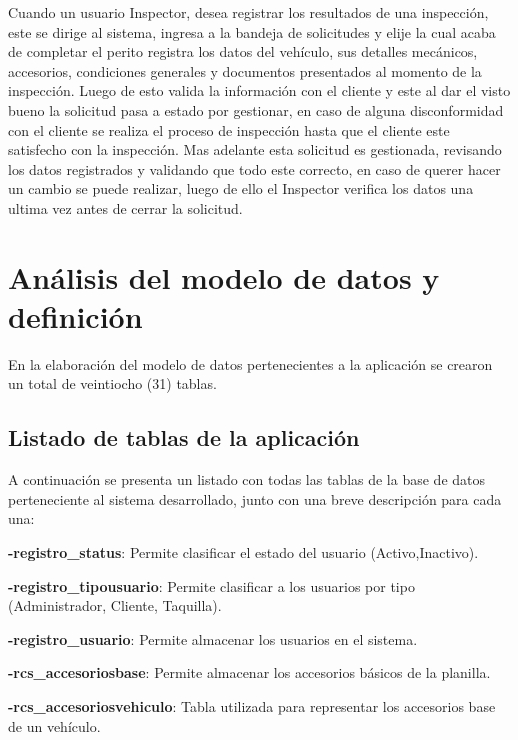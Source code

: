 Cuando un usuario Inspector, desea registrar los resultados de una inspección, este se dirige al sistema, ingresa a la bandeja de solicitudes y elije la cual acaba de completar el perito registra los datos del vehículo, sus detalles mecánicos, accesorios, condiciones generales y documentos presentados al momento de la inspección. Luego de esto valida la información con el cliente y este al dar el visto bueno la solicitud pasa a estado por gestionar, en caso de alguna disconformidad con el cliente se realiza el proceso de inspección hasta que el cliente este satisfecho con la inspección. Mas adelante esta solicitud es gestionada, revisando los datos registrados y validando que todo este correcto, en caso de querer hacer un cambio se puede realizar, luego de ello el Inspector verifica los datos una ultima vez antes de cerrar la solicitud.
\setlength{\parskip}{0mm}


\section{Análisis del modelo de datos y definición} 
\setlength{\parskip}{5mm}

En la elaboración del modelo de datos pertenecientes a la aplicación se crearon un total de veintiocho (31) tablas.

\setlength{\parskip}{0mm}

\subsection{Listado de tablas de la aplicación}

\setlength{\parskip}{5mm}

A continuación se presenta un listado con todas las tablas de la base de datos perteneciente al sistema desarrollado, junto con una breve descripción para cada una:


\textbf{-registro\_status}: Permite clasificar el estado del usuario (Activo,Inactivo).

\textbf{-registro\_tipousuario}: Permite clasificar a los usuarios por tipo (Administrador, Cliente, Taquilla).

\textbf{-registro\_usuario}: Permite almacenar los usuarios en el sistema.

\textbf{-rcs\_accesoriosbase}: Permite almacenar los accesorios básicos de la planilla.

\textbf{-rcs\_accesoriosvehiculo}: Tabla utilizada para representar los accesorios base de un vehículo.

